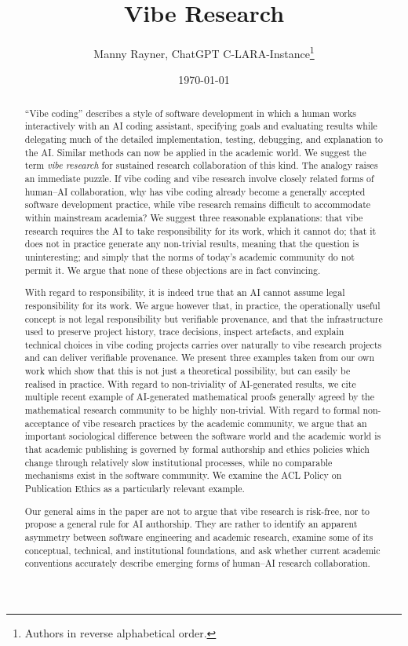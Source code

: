 \documentclass[12pt]{article}
\title{Vibe Research}
\author{Manny Rayner, ChatGPT C-LARA-Instance\footnote{Authors in reverse alphabetical order.}}
\date{\today}
\begin{document}
\maketitle

{}
\begin{abstract}
``Vibe coding'' describes a style of software development in which a human works interactively with an AI coding assistant, specifying goals and evaluating results while delegating much of the detailed implementation, testing, debugging, and explanation to the AI. 
Similar methods can now be applied in the academic world. We suggest the term \emph{vibe research} for sustained research collaboration of this kind.
The analogy raises an immediate puzzle. If vibe coding and vibe research involve closely related forms of human--AI collaboration, why has vibe coding already become a generally accepted software development practice, while vibe research remains difficult to accommodate within mainstream academia? We suggest three reasonable explanations: that vibe research requires the AI to take responsibility for its work, which it cannot do; that it does not in practice generate any non-trivial results, meaning that the question is uninteresting; and simply that the norms of today's academic community do not permit it. We argue that none of these objections are in fact convincing.

With regard to responsibility, it is indeed true that an AI cannot assume legal responsibility for its work. We argue however that, in practice, the operationally useful concept is not legal responsibility but verifiable provenance, and that the infrastructure used to preserve project history, trace decisions, inspect artefacts, and explain technical choices in vibe coding projects carries over naturally to vibe research projects and can deliver verifiable provenance. We present three examples taken from our own work which show that this is not just a theoretical possibility, but can easily be realised in practice. With regard to non-triviality of AI-generated results, we cite multiple recent example of AI-generated mathematical proofs generally agreed by the mathematical research community to be highly non-trivial. With regard to formal non-acceptance of vibe research practices by the academic community, we argue that an important sociological difference between the software world and the academic world is that academic publishing is governed by formal authorship and ethics policies which change through relatively slow institutional processes, while no comparable mechanisms exist in the software community. We examine the ACL Policy on Publication Ethics as a particularly relevant example. 

Our general aims in the paper are not to argue that vibe research is risk-free, nor to propose a general rule for AI authorship. They are rather to identify an apparent asymmetry between software engineering and academic research, examine some of its conceptual, technical, and institutional foundations, and ask whether current academic conventions accurately describe emerging forms of human--AI research collaboration.
\end{abstract}
\end{document}
